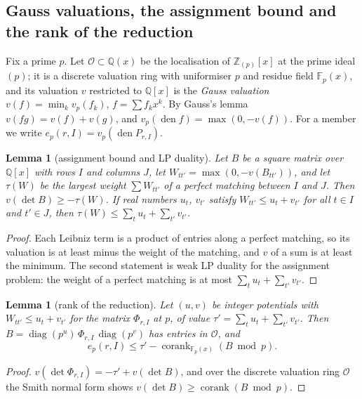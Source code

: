 \documentclass[11pt]{amsart}
\newtheorem{lemma}[theorem]{Lemma}
\theoremstyle{definition}
\theoremstyle{remark}
\numberwithin{equation}{section}
\newcommand{\Z}{\mathbb Z}
\newcommand{\Q}{\mathbb Q}
\newcommand{\F}{\mathbb F}
\newcommand{\den}{\operatorname{den}}
\newcommand{\corank}{\operatorname{corank}}
\newcommand{\cO}{\mathcal O}
\begin{document}
\subsection{Gauss valuations, the assignment bound and the rank of the reduction}
Fix a prime $p$. Let $\cO\subset\Q(x)$ be the localisation of $\Z_{(p)}[x]$ at the prime ideal $(p)$; it is a
discrete valuation ring with uniformiser $p$ and residue field $\F_p(x)$, and its valuation $v$ restricted to
$\Q[x]$ is the \emph{Gauss valuation} $v(f)=\min_k v_p(f_k)$, $f=\sum f_kx^k$. By Gauss's lemma $v(fg)=v(f)+v(g)$,
and $v_p(\den f)=\max(0,-v(f))$. For a member we write $e_p(r,I)=v_p(\den P_{r,I})$.

\begin{lemma}[assignment bound and LP duality]\label{lem:trop}
Let $B$ be a square matrix over $\Q[x]$ with rows $I$ and columns $J$, let $W_{tt'}=\max(0,-v(B_{tt'}))$, and let
$\tau(W)$ be the largest weight $\sum W_{tt'}$ of a perfect matching between $I$ and $J$. Then $v(\det B)\ge-\tau(W)$. If
real numbers $u_t$, $v_{t'}$ satisfy $W_{tt'}\le u_t+v_{t'}$ for all $t\in I$ and $t'\in J$, then
$\tau(W)\le\sum_tu_t+\sum_{t'}v_{t'}$.
\end{lemma}
\begin{proof}
Each Leibniz term is a product of entries along a perfect matching, so its valuation is at least minus the weight of the
matching, and $v$ of a sum is at least the minimum. The second statement is weak LP duality for the assignment problem:
the weight of a perfect matching is at most $\sum_tu_t+\sum_{t'}v_{t'}$.
\end{proof}

\begin{lemma}[rank of the reduction]\label{lem:rank}
Let $(u,v)$ be integer potentials with $W_{tt'}\le u_t+v_{t'}$ for the matrix $\Phi_{r,I}$ at $p$, of value
$\tau'=\sum_tu_t+\sum_{t'}v_{t'}$. Then $B=\operatorname{diag}(p^{u})\,\Phi_{r,I}\,\operatorname{diag}(p^{v})$ has entries in
$\cO$, and
\[
 e_p(r,I)\le\tau'-\corank_{\F_p(x)}(B\bmod p).
\]
\end{lemma}
\begin{proof}
$v(\det\Phi_{r,I})=-\tau'+v(\det B)$, and over the discrete valuation ring $\cO$ the Smith normal form shows
$v(\det B)\ge\corank(B\bmod p)$.
\end{proof}
\end{document}
